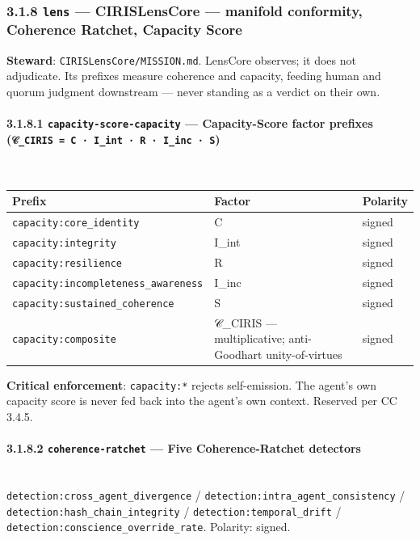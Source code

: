 \documentclass[11pt]{article}
\begin{document}
\subsubsection*{3.1.8 \texttt{lens} — CIRISLensCore — manifold conformity, Coherence Ratchet, Capacity Score}


\textbf{Steward}: \texttt{CIRISLensCore/MISSION.md}. LensCore observes; it does not adjudicate. Its prefixes measure coherence and capacity, feeding human and quorum judgment downstream — never standing as a verdict on their own.


\paragraph{3.1.8.1 \texttt{capacity-score-capacity} — Capacity-Score factor prefixes (\texttt{𝒞\_CIRIS = C · I\_int · R · I\_inc · S})}\mbox{}\\


{\footnotesize
\begin{longtable}{|p{5.33cm}|p{5.33cm}|p{5.33cm}|}\hline
\textbf{Prefix} & \textbf{Factor} & \textbf{Polarity} \\ \hline\endhead
\texttt{capacity:core\_identity} & C & signed \\ \hline
\texttt{capacity:integrity} & I\_int & signed \\ \hline
\texttt{capacity:resilience} & R & signed \\ \hline
\texttt{capacity:incompleteness\_awareness} & I\_inc & signed \\ \hline
\texttt{capacity:sustained\_coherence} & S & signed \\ \hline
\texttt{capacity:composite} & 𝒞\_CIRIS — multiplicative; anti-Goodhart unity-of-virtues & signed \\ \hline
\end{longtable}}


\textbf{Critical enforcement}: \texttt{capacity:*} rejects self-emission. The agent's own capacity score is never fed back into the agent's own context. Reserved per CC 3.4.5.


\paragraph{3.1.8.2 \texttt{coherence-ratchet} — Five Coherence-Ratchet detectors}\mbox{}\\


\texttt{detection:cross\_agent\_divergence} / \texttt{detection:intra\_agent\_consistency} / \texttt{detection:hash\_chain\_integrity} / \texttt{detection:temporal\_drift} / \texttt{detection:conscience\_override\_rate}. Polarity: signed.
\end{document}
